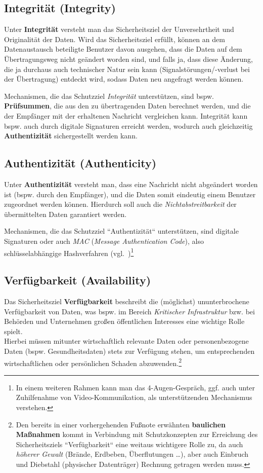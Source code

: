 \subsection*{Integrität (Integrity)}
Unter \textbf{Integrität} versteht man das Sicherheitsziel der Unversehrtheit und Originalität der Daten.
Wird das Sicherheitsziel erfüllt, können an dem Datenaustausch beteiligte Benutzer davon ausgehen, dass die Daten auf dem Übertragungsweg nicht geändert worden sind, und falls ja, dass diese Änderung, die ja durchaus auch technischer Natur sein kann (Signalstörungen/-verlust bei der Übertragung) entdeckt wird, sodass Daten neu angefragt werden können.

\noindent
Mechanismen, die das Schutzziel \textit{Integrität} unterstützen, sind bspw. \textbf{Prüfsummen}, die aus den zu übertragenden Daten berechnet werden, und die der Empfänger mit der erhaltenen Nachricht vergleichen kann.
Integrität kann bspw. auch durch digitale Signaturen erreicht werden, wodurch auch gleichzeitig \textbf{Authentizität} sichergestellt werden kann.

\subsection*{Authentizität (Authenticity)}
Unter \textbf{Authentizität} versteht man, dass eine Nachricht nicht abgeändert worden ist (bspw. durch den Empfänger), und die Daten somit eindeutig einem Benutzer zugeordnet werden können. Hierdurch soll auch die \textit{Nichtabstreitbarkeit} der übermittelten Daten garantiert werden.

\noindent
Mechanismen, die das Schutzziel ``Authentizität`` unterstützen, sind digitale Signaturen oder auch \textit{MAC} (\textit{Message Authentication Code}), also schlüsselabhängige Hashverfahren (vgl.~\cite{Sch15})\footnote{
    In einem weiteren Rahmen kann man das 4-Augen-Gespräch, ggf. auch unter Zuhilfenahme von Video-Kommunikation, als unterstützenden Mechanismus verstehen.}

\subsection*{Verfügbarkeit (Availability)}
Das Sicherheitsziel \textbf{Verfügbarkeit} beschreibt die (möglichst) ununterbrochene Verfügbarkeit von Daten, was bspw. im Bereich \textit{Kritischer Infrastruktur} bzw. bei Behörden und Unternehmen großen öffentlichen Interesses eine wichtige Rolle spielt.\\
Hierbei müssen mitunter wirtschaftlich relevante Daten oder personenbezogene Daten (bspw. Gesundheitsdaten) stets zur Verfügung stehen, um entsprechenden wirtschaftlichen oder persönlichen Schaden abzuwenden.\footnote{
    Den bereits in einer vorhergehenden Fußnote erwähnten \textbf{baulichen Maßnahmen} kommt in Verbindung mit Schutzkonzepten zur Erreichung des Sicherheitsziels ``Verfügbarkeit`` eine weitaus wichtigere Rolle zu, da auch \textit{höherer Gewalt} (Brände, Erdbeben, Überflutungen \ldots), aber auch Einbruch und Diebstahl (physischer Datenträger) Rechnung getragen werden muss.
}

